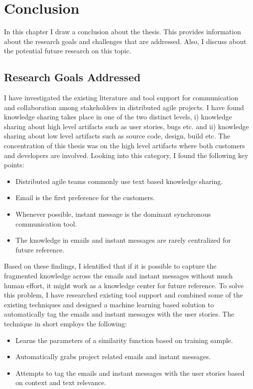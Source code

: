 \fancyhead[RO,LE]{\thepage}
\fancyfoot{} 
\chapter{Conclusion} 
In this chapter I draw a conclusion about the thesis. This provides information about the research goals and challenges that are addressed. Also, I discuss about the potential future research on this topic.

\section{Research Goals Addressed}
I have investigated the existing literature and tool support for communication and collaboration among stakeholders in distributed agile projects. I have found knowledge sharing takes place in one of the two distinct levels, i) knowledge sharing about high level artifacts such as user stories, bugs etc. and ii) knowledge sharing about low level artifacts such as source code, design, build etc. The concentration of this thesis was on the high level artifacts where both customers and developers are involved. Looking into this category, I found the following key points:
\begin{itemize}
	\item Distributed agile teams commonly use text based knowledge sharing.
	\item Email is the first preference for the customers.
	\item Whenever possible, instant message is the dominant synchronous communication tool.	
	\item The knowledge in emails and instant messages are rarely centralized for future reference.
\end{itemize}

Based on these findings, I identified that if it is possible to capture the fragmented knowledge across the emails and instant messages without much human effort, it might work as a knowledge center for future reference. To solve this problem, I have researched existing tool support and combined some of the existing techniques and designed a machine learning based solution to automatically tag the emails and instant messages with the user stories. The technique in short employs the following:
\begin{itemize}
	\item Learns the parameters of a similarity function based on training sample.
	\item Automatically grabs project related emails and instant messages.
	\item Attempts to tag the emails and instant messages with the user stories based on context and text relevance.
\end{itemize}

